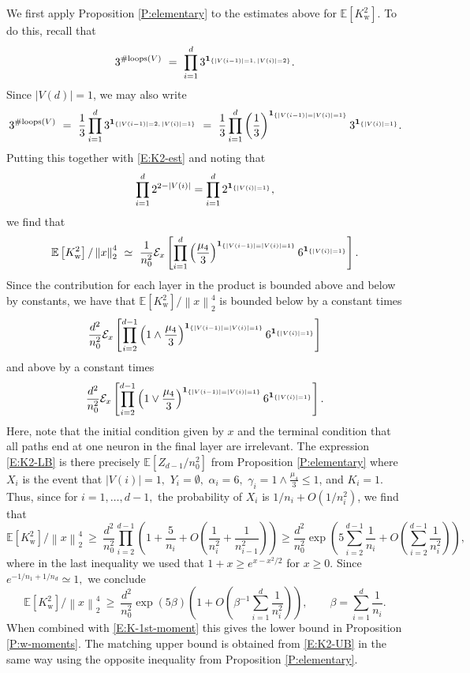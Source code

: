 \documentclass[11pt, reqno]{amsart}
\newcommand{\E}[1]{{\mathbb E}\left [#1\right]}
\newcommand{\abs}[1]{\ensuremath{\left| #1 \right|}}
\newcommand{\lr}[1]{\ensuremath{\left(#1 \right)}}
\newcommand{\norm}[1]{\left\lVert#1\right\rVert}
\newcommand{\set}[1]{\ensuremath{\{#1\}}}
\newcommand{\Kw}{K_{\mathrm{w}}}
\begin{document}
\noindent We first apply Proposition \ref{P:elementary} to the estimates above for $\E{\Kw^2}$. To do this, recall that 
\[3^{\#\text{loops}(V)}~=~\prod_{i=1}^d 3^{{\bf 1}_{\set{\abs{V(i-1)}=1,\, \abs{V(i)}=2}}}.\]
Since $\abs{V(d)}=1$, we may also write
\[3^{\#\text{loops}(V)}~=~\frac{1}{3}\prod_{i=1}^d 3^{{\bf 1}_{\set{\abs{V(i-1)}=2,\, \abs{V(i)}=1}}}~=~\frac{1}{3}\prod_{i=1}^d \lr{\frac{1}{3}}^{{\bf 1}_{\set{\abs{V(i-1)}=\abs{V(i)}=1}}}3^{{\bf 1}_{\set{\abs{V(i)}=1}}}.\]
Putting this together with \eqref{E:K2-est} and noting that
\[\prod_{i=1}^d 2^{2-\abs{V(i)}}=\prod_{i=1}^d 2^{{\bf 1}_{\set{\abs{V(i)}=1}}},\]
we find that 
\[\E{\Kw^2} / \norm{x}_2^4~\simeq ~\frac{1}{n_0^2}\mathcal E_x\left[\prod_{i=1}^d \lr{\frac{\mu_4}{3}}^{{\bf 1}_{\set{\abs{V(i-1)}=\abs{V(i)}=1}}}6^{{\bf 1}_{\set{\abs{V(i)}=1}}}\right].\]
Since the contribution for each layer in the product is bounded above and below by constants, we have that $\E{\Kw^2} / \norm{x}_2^4$ is bounded below by a constant times
\begin{equation}\label{E:K2-LB}
\frac{d^2}{n_0^2}\mathcal E_x\left[\prod_{i=2}^{d-1} \lr{1\land \frac{\mu_4}{3}}^{{\bf 1}_{\set{\abs{V(i-1)}=\abs{V(i)}=1}}}6^{{\bf 1}_{\set{\abs{V(i)}=1}}}\right]
\end{equation}
and above by a constant times
\begin{equation}\label{E:K2-UB}
\frac{d^2}{n_0^2}\mathcal E_x\left[\prod_{i=2}^{d-1} \lr{1\lor \frac{\mu_4}{3}}^{{\bf 1}_{\set{\abs{V(i-1)}=\abs{V(i)}=1}}}6^{{\bf 1}_{\set{\abs{V(i)}=1}}}\right].
\end{equation}
Here, note that the initial condition given by $x$ and the terminal condition that all paths end at one neuron in the final layer are irrelevant. The expression \eqref{E:K2-LB} is there precisely $\E{Z_{d-1}/n_0^2}$ from Proposition \ref{P:elementary} where $X_i$ is the event that $\abs{V(i)}=1,$ $Y_i=\emptyset,$ $\alpha_i=6,$ $\gamma_i =1\land \frac{\mu_4}{3}\leq 1$, and $K_i=1$. Thus, since for $i=1,\ldots, d-1,$ the probability of $X_i$ is $1/n_i + O(1/n_i^2)$, we find that 
\[\E{\Kw^2} / \norm{x}_2^4~\geq~\frac{d^2}{n_0^2}\prod_{i=2}^{d-1}\lr{1+\frac{5}{n_i}+O\lr{\frac{1}{n_i^2}+\frac{1}{n_{i-1}^2}}}\geq \frac{d^2}{n_0^2}\exp\lr{5\sum_{i=2}^{d-1} \frac{1}{n_i} + O\lr{\sum_{i=2}^{d-1}\frac{1}{n_i^2}}},\]
where in the last inequality we used that $1+x\geq e^{x-x^2/2}$ for $x\geq 0.$ Since $e^{-1/n_1+1/n_d}\simeq 1,$ we conclude
\[\E{\Kw^2} / \norm{x}_2^4~\geq~\frac{d^2}{n_0^2}\exp\lr{5\beta}\lr{1 + O\lr{\beta^{-1}\sum_{i=1}^{d}\frac{1}{n_i^2}}},\qquad \beta = \sum_{i=1}^{d} \frac{1}{n_i}.\]
When combined with \eqref{E:K-1st-moment} this gives the lower bound in Proposition \ref{P:w-moments}. The matching upper bound is obtained from \eqref{E:K2-UB} in the same way using the opposite inequality from Proposition \ref{P:elementary}.\\
\end{document}
